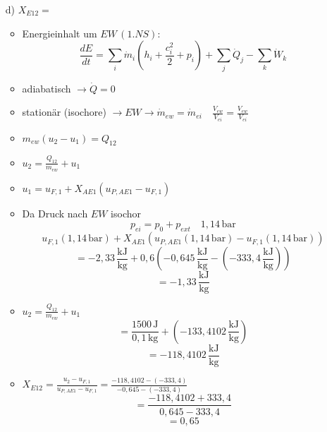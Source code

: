 \begin{itemize}
    \item[d)] $X_{E12} = $
    \begin{itemize}
        \item Energieinhalt um $EW \, (1. NS)$:
        \begin{equation*}
            \frac{dE}{dt} = \sum_i \dot{m}_i (h_i + \frac{c_i^2}{2} + p_i) + \sum_j \dot{Q}_j - \sum_k \dot{W}_k
        \end{equation*}
        \item adiabatisch $\rightarrow \dot{Q} = 0$
        \item stationär (isochore) $\rightarrow EW \rightarrow \dot{m}_{ew} = \dot{m}_{ei} \quad \frac{V_{ew}}{V_{ei}} = \frac{V_{ew}}{V_{ei}}$
        \item $m_{ew} (u_2 - u_1) = Q_{12}$
        \item $u_2 = \frac{Q_{12}}{m_{ew}} + u_1$
        \item $u_1 = u_{F,1} + X_{AE1} (u_{P,AE1} - u_{F,1})$
        \item Da Druck nach $EW$ isochor
        \begin{equation*}
            p_{ei} = p_0 + p_{ext} \quad 1,14 \, \text{bar}
        \end{equation*}
        \begin{equation*}
            u_{F,1} (1,14 \, \text{bar}) + X_{AE1} (u_{P,AE1} (1,14 \, \text{bar}) - u_{F,1} (1,14 \, \text{bar}))
        \end{equation*}
        \begin{equation*}
            = -2,33 \, \frac{\text{kJ}}{\text{kg}} + 0,6 \left( -0,645 \, \frac{\text{kJ}}{\text{kg}} - (-333,4 \, \frac{\text{kJ}}{\text{kg}}) \right)
        \end{equation*}
        \begin{equation*}
            = -1,33 \, \frac{\text{kJ}}{\text{kg}}
        \end{equation*}
        \item $u_2 = \frac{Q_{12}}{m_{ew}} + u_1$
        \begin{equation*}
            = \frac{1500 \, \text{J}}{0,1 \, \text{kg}} + (-133,4102 \, \frac{\text{kJ}}{\text{kg}})
        \end{equation*}
        \begin{equation*}
            = -118,4102 \, \frac{\text{kJ}}{\text{kg}}
        \end{equation*}
        \item $X_{E12} = \frac{u_2 - u_{F,1}}{u_{P,AE1} - u_{F,1}} = \frac{-118,4102 - (-333,4)}{-0,645 - (-333,4)}$
        \begin{equation*}
            = \frac{-118,4102 + 333,4}{0,645 - 333,4}
        \end{equation*}
        \begin{equation*}
            = 0,65
        \end{equation*}
    \end{itemize}
\end{itemize}

